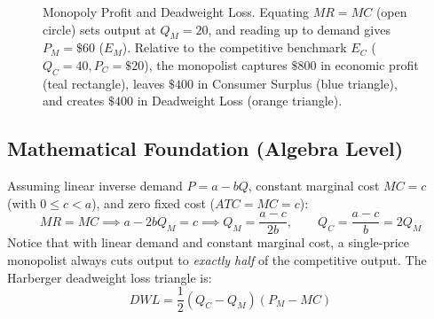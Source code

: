 \documentclass[11pt,letterpaper]{article}
\begin{document}
\begin{figure}[htbp]
\caption{Monopoly Profit and Deadweight Loss. Equating $MR = MC$ (open circle) sets output at $Q_M = 20$, and reading up to demand gives $P_M = \$60$ ($E_M$). Relative to the competitive benchmark $E_C$ ($Q_C = 40, P_C = \$20$), the monopolist captures $\$800$ in economic profit (teal rectangle), leaves $\$400$ in Consumer Surplus (blue triangle), and creates $\$400$ in Deadweight Loss (orange triangle).}
\label{fig:monopoly_welfare}
\end{figure}

\subsection*{Mathematical Foundation (Algebra Level)}
Assuming linear inverse demand $P = a - bQ$, constant marginal cost $MC = c$ (with $0 \le c < a$), and zero fixed cost ($ATC = MC = c$):
\begin{equation}
MR = MC \implies a - 2bQ_M = c \implies Q_M = \frac{a - c}{2b}, \qquad Q_C = \frac{a - c}{b} = 2Q_M
\end{equation}
Notice that with linear demand and constant marginal cost, a single-price monopolist always cuts output to \emph{exactly half} of the competitive output. The Harberger deadweight loss triangle is:
\begin{equation}
DWL = \frac{1}{2}(Q_C - Q_M)(P_M - MC)
\end{equation}
\end{document}
